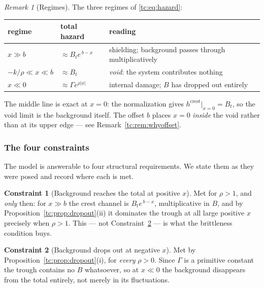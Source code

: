 \documentclass[11pt]{article}
\numberwithin{equation}{section}
\theoremstyle{plain}
\theoremstyle{definition}
\newtheorem{constraint}{Constraint}
\theoremstyle{remark}
\newtheorem{remark}[theorem]{Remark}
\begin{document}
\begin{remark}[Regimes]\label{tc:rem:regimes}
The three regimes of \eqref{tc:eq:hazard}:
\begin{center}\small
\begin{tabular}{@{}lll@{}}
\toprule
regime & total hazard & reading\\
\midrule
$x\gg b$ & $\approx B_te^{\,b-x}$ & shielding; background passes through
multiplicatively\\
$-k/\rho\ll x\ll b$ & $\approx B_t$ & \emph{void}: the system
contributes nothing\\
$x\ll0$ & $\approx\Gamma e^{\rho|x|}$ & internal damage; $B$ has dropped
out entirely\\
\bottomrule
\end{tabular}
\end{center}
The middle line is exact at $x=0$: the normalization gives
$h^{\mathrm{crest}}|_{x=0}=B_t$, so the void limit is the background
itself. The offset $b$ places $x=0$ \emph{inside} the void rather than
at its upper edge --- see Remark~\ref{tc:rem:whyoffset}.
\end{remark}

\subsubsection{The four constraints}\label{tc:subsub:constraints}

The model is answerable to four structural requirements. We state them
as they were posed and record where each is met.

\begin{constraint}[Background reaches the total at positive $x$]
\label{tc:C1}
Met for $\rho>1$, and \emph{only} then: for $x\gg b$ the crest channel
is $B_te^{\,b-x}$, multiplicative in $B$, and by
Proposition~\ref{tc:prop:dropout}(ii) it dominates the trough at all
large positive $x$ precisely when $\rho>1$. This --- not
Constraint~\ref{tc:C2} --- is what the brittleness condition buys.
\end{constraint}

\begin{constraint}[Background drops out at negative $x$]\label{tc:C2}
Met by Proposition~\ref{tc:prop:dropout}(i), for \emph{every} $\rho>0$.
Since $\Gamma$ is a primitive constant the trough contains no $B$
whatsoever, so at $x\ll0$ the background disappears from the total
entirely, not merely in its fluctuations.
\end{constraint}
\end{document}
